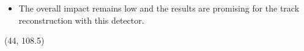 \documentclass[final,xcolor={dvipsnames,svgnames,x11names,table}]{beamer}
\begin{document}
\begin{frame}
\begin{textblock}{39.5}
\begin{tcolorbox}[title=Conclusions]
   \vspace{0.3cm}

   \begin{itemize}
    \item The overall impact remains low and the results are promising for the track reconstruction with this detector.
   \end{itemize}

   \vspace{0.3cm}

  \end{tcolorbox}
 \end{textblock}

 \begin{textblock}{39.5}(44, 108.5)
   \begin{tcolorbox}[title=References]

   \printbibliography

  \end{tcolorbox}
 \end{textblock}

\end{frame}
\end{document}

